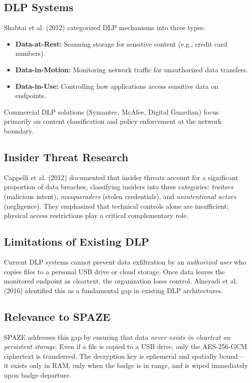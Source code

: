 \documentclass[conference]{IEEEtran}
\begin{document}
\subsection{DLP Systems}
Shabtai et al. (2012) \cite{shabtai2012} categorized DLP mechanisms into three types:
\begin{itemize}[noitemsep]
    \item \textbf{Data-at-Rest:} Scanning storage for sensitive content (e.g., credit card numbers).
    \item \textbf{Data-in-Motion:} Monitoring network traffic for unauthorized data transfers.
    \item \textbf{Data-in-Use:} Controlling how applications access sensitive data on endpoints.
\end{itemize}
Commercial DLP solutions (Symantec, McAfee, Digital Guardian) focus primarily on content classification and policy enforcement at the network boundary.

\subsection{Insider Threat Research}
Cappelli et al. (2012) \cite{cappelli2012} documented that insider threats account for a significant proportion of data breaches, classifying insiders into three categories: \textit{traitors} (malicious intent), \textit{masqueraders} (stolen credentials), and \textit{unintentional actors} (negligence). They emphasized that technical controls alone are insufficient; physical access restrictions play a critical complementary role.

\subsection{Limitations of Existing DLP}
Current DLP systems cannot prevent data exfiltration by an \textit{authorized user} who copies files to a personal USB drive or cloud storage. Once data leaves the monitored endpoint as cleartext, the organization loses control. Alneyadi et al. (2016) \cite{alneyadi2016} identified this as a fundamental gap in existing DLP architectures.

\subsection{Relevance to SPAZE}
SPAZE addresses this gap by ensuring that data \textit{never exists in cleartext on persistent storage}. Even if a file is copied to a USB drive, only the AES-256-GCM ciphertext is transferred. The decryption key is ephemeral and spatially bound—it exists only in RAM, only when the badge is in range, and is wiped immediately upon badge departure.
\end{document}
